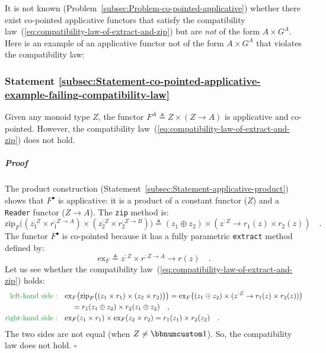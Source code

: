 It is not known (Problem~\ref{subsec:Problem-co-pointed-applicative})
whether there exist co-pointed applicative functors that satisfy the
compatibility law~(\ref{eq:compatibility-law-of-extract-and-zip})
but are \emph{not} of the form $A\times G^{A}$. Here is an example
of an applicative functor not of the form $A\times G^{A}$ that violates
the compatibility law:

\subsubsection{Statement \label{subsec:Statement-co-pointed-applicative-example-failing-compatibility-law}\ref{subsec:Statement-co-pointed-applicative-example-failing-compatibility-law}}

Given any monoid type $Z$, the functor $F^{A}\triangleq Z\times\left(Z\rightarrow A\right)$
is applicative and co-pointed. However, the compatibility law~(\ref{eq:compatibility-law-of-extract-and-zip})
does not hold. 

\subparagraph{Proof}

The product construction (Statement~\ref{subsec:Statement-applicative-product})
shows that $F^{\bullet}$ is applicative: it is a product of a constant
functor ($Z$) and a \lstinline!Reader! functor ($Z\rightarrow A$).
The \lstinline!zip! method is:
\[
\text{zip}_{F}\big((z_{1}^{:Z}\times r_{1}^{:Z\rightarrow A})\times(z_{2}^{:Z}\times r_{2}^{:Z\rightarrow B})\big)\triangleq(z_{1}\oplus z_{2})\times(z^{:Z}\rightarrow r_{1}(z)\times r_{2}(z))\quad.
\]
 The functor $F^{\bullet}$ is co-pointed because it has a fully parametric
\lstinline!extract! method defined by: 
\[
\text{ex}_{F}\triangleq z^{:Z}\times r^{:Z\rightarrow A}\rightarrow r(z)\quad.
\]
Let us see whether the compatibility law~(\ref{eq:compatibility-law-of-extract-and-zip})
holds:
\begin{align*}
{\color{greenunder}\text{left-hand side}:}\quad & \text{ex}_{F}\big(\text{zip}_{F}\big((z_{1}\times r_{1})\times(z_{2}\times r_{2})\big)\big)=\text{ex}_{F}\big((z_{1}\oplus z_{2})\times(z^{:Z}\rightarrow r_{1}(z)\times r_{2}(z))\big)\\
 & \quad=r_{1}(z_{1}\oplus z_{2})\times r_{2}(z_{1}\oplus z_{2})\quad,\\
{\color{greenunder}\text{right-hand side}:}\quad & \text{ex}_{F}(z_{1}\times r_{1})\times\text{ex}_{F}(z_{2}\times r_{2})=r_{1}(z_{1})\times r_{2}(z_{2})\quad.
\end{align*}
The two sides are not equal (when $Z\neq\bbnum 1$). So, the compatibility
law does not hold. $\square$

